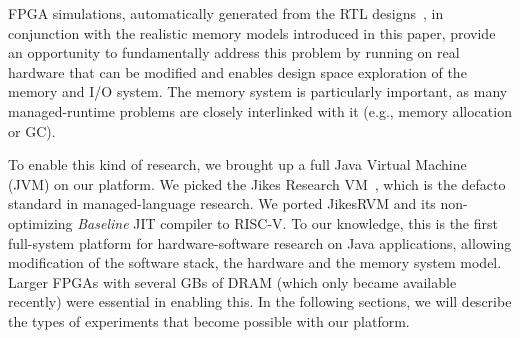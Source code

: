 FPGA simulations, automatically generated from the RTL designs~\cite{strober},
in conjunction with the realistic memory models introduced in this paper,
provide an opportunity to fundamentally address this problem by running on real
hardware that can be modified and enables design space exploration of the
memory and I/O system. The memory system is particularly important, as many
managed-runtime problems are closely interlinked with it (e.g., memory
allocation or GC).

To enable this kind of research, we brought up a full Java Virtual Machine
(JVM) on our platform. We picked the Jikes Research
VM~\cite{alpern_jikes_2005}, which is the defacto standard in managed-language
research. We ported JikesRVM and its non-optimizing \emph{Baseline} JIT
compiler to RISC-V. To our knowledge, this is the first full-system platform
for hardware-software research on Java applications, allowing modification of
the software stack, the hardware and the memory system model. Larger FPGAs with
several GBs of DRAM (which only became available recently) were essential in
enabling this. In the following sections, we will describe the types of
experiments that become possible with our platform.


